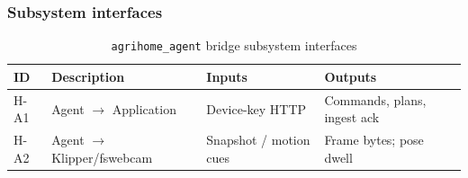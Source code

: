 \subsubsection{Subsystem interfaces}
\begin{table}[H]
\centering
\small
\begin{tabular}{|p{0.9cm}|p{3.4cm}|p{3.0cm}|p{3.5cm}|}
\hline
\textbf{ID} & \textbf{Description} & \textbf{Inputs} & \textbf{Outputs} \\
\hline
H-A1 & Agent $\rightarrow$ Application & Device-key HTTP & Commands, plans, ingest ack \\
\hline
H-A2 & Agent $\rightarrow$ Klipper/fswebcam & Snapshot / motion cues & Frame bytes; pose dwell \\
\hline
\end{tabular}
\caption{\texttt{agrihome\_agent} bridge subsystem interfaces}
\end{table}
